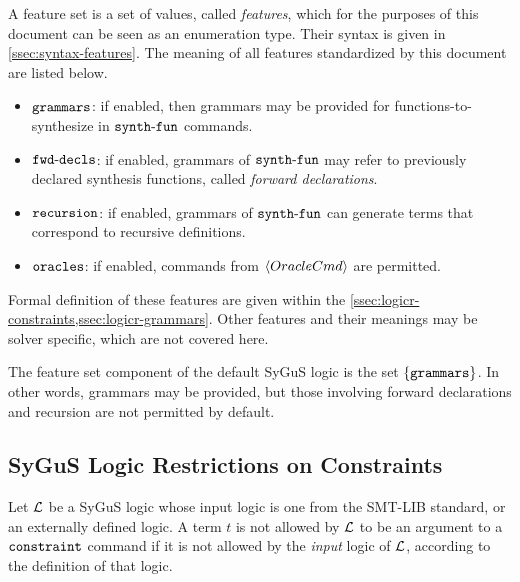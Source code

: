 \documentclass[english,a4paper,10pt]{article}
\begin{document}
A feature set is a set of values, called \emph{features},
which for the purposes of this document can be seen as an enumeration type.
Their syntax is given in \cref{ssec:syntax-features}.
The meaning of all features standardized by this document are listed below.
\begin{itemize}
\item ${\tt grammars}$: if enabled, 
then grammars may be provided for functions-to-synthesize 
in ${\tt synth\mbox{-}fun}$ commands.
\item ${\tt fwd\mbox{-}decls}$: if enabled,
grammars of ${\tt synth\mbox{-}fun}$ may refer to previously declared synthesis functions,
called \emph{forward declarations}.
\item ${\tt recursion}$: if enabled,
grammars of ${\tt synth\mbox{-}fun}$ can generate terms that correspond to recursive definitions.
\item ${\tt oracles}$: if enabled,
commands from $\left\langle OracleCmd\right\rangle$ are permitted.
\end{itemize}
Formal definition of these features are given within the 
\cref{ssec:logicr-constraints,ssec:logicr-grammars}.
Other features and their meanings may be solver specific, 
which are not covered here.

The feature set component of the default SyGuS logic is the set $\{ {\tt grammars} \}$.
In other words, grammars may be provided, but those involving
forward declarations and recursion are not permitted by default.

\subsection{SyGuS Logic Restrictions on Constraints}
\label{ssec:logicr-constraints}


Let $\mathcal{L}$ be a SyGuS logic whose input logic
is one from the SMT-LIB standard, or an externally defined logic.
A term $t$ is not allowed by $\mathcal{L}$ 
to be an argument to a ${\tt constraint}$ command 
if it is not allowed by the \emph{input} logic of $\mathcal{L}$, 
according to the definition of that logic.
\end{document}
